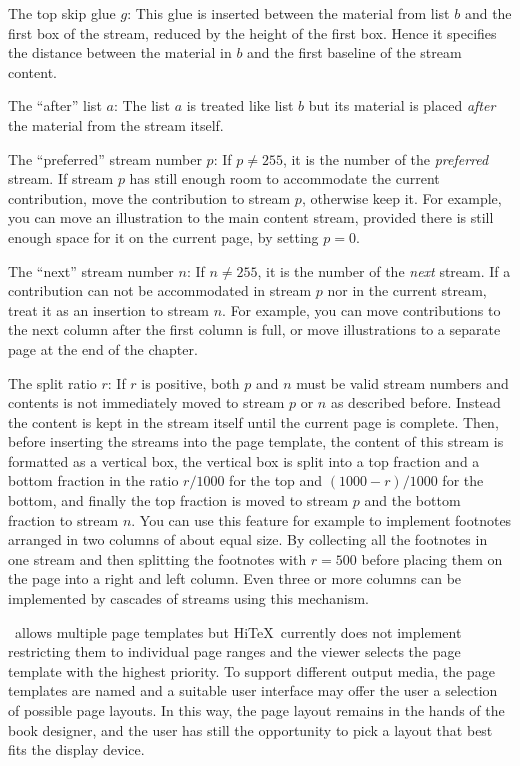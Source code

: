 \item The top skip glue $g$: This glue is inserted between the material
from list $b$ and the first box of the stream, reduced
by the height of the first box. Hence it specifies the distance between
the material in $b$ and the first baseline of the stream content.

\item The ``after'' list $a$: The list $a$ is treated like list $b$ but
its material is placed {\it after\/} the  material from the stream itself.

\item The ``preferred'' stream number $p$:  If $p\ne 255$, it is the number of 
the {\it preferred\/} stream. If stream $p$ has still
enough room to accommodate the current contribution, move the
contribution to stream $p$, otherwise keep it.  For example, you can
move an illustration to the main content stream, provided there is
still enough space for it on the current page, by setting $p=0$.

\item The ``next'' stream number $n$: If $n\ne 255$, it is the number of the 
{\it next\/} stream. If a contribution can not be
accommodated in stream $p$ nor in the current stream, treat it as an
insertion to stream $n$.  For example, you can move contributions to
the next column after the first column is full, or move illustrations
to a separate page at the end of the chapter.

\item The split ratio $r$: If $r$ is positive, both $p$ and $n$ must 
be valid stream numbers and contents is not immediately moved to stream $p$ or $n$ as described before.
Instead the content is kept in the stream itself until the current page is complete.
Then, before inserting the streams into the page template, the content of
this stream is formatted as a vertical box, the vertical box is
split into a top fraction and a bottom fraction in the ratio $r/1000$
for the top and $(1000-r)/1000$ for the bottom, and finally the top
fraction is moved to stream $p$ and the bottom fraction to stream
$n$. You can use this feature for example to implement footnotes
arranged in two columns of about equal size. By collecting all the
footnotes in one stream and then splitting the footnotes with $r=500$
before placing them on the page into a right and left column.  Even
three or more columns can be implemented by cascades of streams using
this mechanism.
\enditemize

\HINT\ allows multiple page templates but Hi\TeX\ currently does not implement
restricting them to individual page ranges and the viewer selects
the page template with the highest priority. To support different output media, the page
templates are named and a suitable user interface may offer the user a selection
of possible page layouts. In this way, the page layout remains in the hands of the
book designer, and the user has still the opportunity to pick a layout that best fits
the display device.

